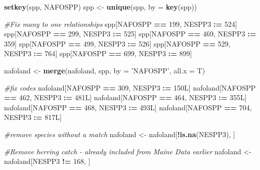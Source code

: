 \documentclass[]{article}
\newenvironment{Shaded}{\begin{snugshade}}{\end{snugshade}}
\newcommand{\KeywordTok}[1]{\textcolor[rgb]{0.13,0.29,0.53}{\textbf{#1}}}
\newcommand{\DataTypeTok}[1]{\textcolor[rgb]{0.13,0.29,0.53}{#1}}
\newcommand{\DecValTok}[1]{\textcolor[rgb]{0.00,0.00,0.81}{#1}}
\newcommand{\StringTok}[1]{\textcolor[rgb]{0.31,0.60,0.02}{#1}}
\newcommand{\CommentTok}[1]{\textcolor[rgb]{0.56,0.35,0.01}{\textit{#1}}}
\newcommand{\OperatorTok}[1]{\textcolor[rgb]{0.81,0.36,0.00}{\textbf{#1}}}
\newcommand{\ErrorTok}[1]{\textcolor[rgb]{0.64,0.00,0.00}{\textbf{#1}}}
\newcommand{\NormalTok}[1]{#1}
\begin{document}
\begin{Shaded}
\begin{Highlighting}[]
{{{{{{{{{{  \KeywordTok{setkey}\NormalTok{(spp, NAFOSPP)}
\NormalTok{  spp <-}\StringTok{ }\KeywordTok{unique}\NormalTok{(spp, }\DataTypeTok{by =} \KeywordTok{key}\NormalTok{(spp))}
  
  \CommentTok{#Fix many to one relationships}
\NormalTok{  spp[NAFOSPP }\OperatorTok{==}\StringTok{ }\DecValTok{199}\NormalTok{, NESPP3 }\OperatorTok{:}\ErrorTok{=}\StringTok{ }\DecValTok{524}\NormalTok{]}
\NormalTok{  spp[NAFOSPP }\OperatorTok{==}\StringTok{ }\DecValTok{299}\NormalTok{, NESPP3 }\OperatorTok{:}\ErrorTok{=}\StringTok{ }\DecValTok{525}\NormalTok{]}
\NormalTok{  spp[NAFOSPP }\OperatorTok{==}\StringTok{ }\DecValTok{469}\NormalTok{, NESPP3 }\OperatorTok{:}\ErrorTok{=}\StringTok{ }\DecValTok{359}\NormalTok{]}
\NormalTok{  spp[NAFOSPP }\OperatorTok{==}\StringTok{ }\DecValTok{499}\NormalTok{, NESPP3 }\OperatorTok{:}\ErrorTok{=}\StringTok{ }\DecValTok{526}\NormalTok{]}
\NormalTok{  spp[NAFOSPP }\OperatorTok{==}\StringTok{ }\DecValTok{529}\NormalTok{, NESPP3 }\OperatorTok{:}\ErrorTok{=}\StringTok{ }\DecValTok{764}\NormalTok{]}
\NormalTok{  spp[NAFOSPP }\OperatorTok{==}\StringTok{ }\DecValTok{699}\NormalTok{, NESPP3 }\OperatorTok{:}\ErrorTok{=}\StringTok{ }\DecValTok{899}\NormalTok{]}
  
\NormalTok{  nafoland <-}\StringTok{ }\KeywordTok{merge}\NormalTok{(nafoland, spp, }\DataTypeTok{by =} \StringTok{'NAFOSPP'}\NormalTok{, }\DataTypeTok{all.x =}\NormalTok{ T)}
  
  \CommentTok{#fix codes}
\NormalTok{  nafoland[NAFOSPP }\OperatorTok{==}\StringTok{ }\DecValTok{309}\NormalTok{, NESPP3 }\OperatorTok{:}\ErrorTok{=}\StringTok{ }\NormalTok{150L]}
\NormalTok{  nafoland[NAFOSPP }\OperatorTok{==}\StringTok{ }\DecValTok{462}\NormalTok{, NESPP3 }\OperatorTok{:}\ErrorTok{=}\StringTok{ }\NormalTok{481L]}
\NormalTok{  nafoland[NAFOSPP }\OperatorTok{==}\StringTok{ }\DecValTok{464}\NormalTok{, NESPP3 }\OperatorTok{:}\ErrorTok{=}\StringTok{ }\NormalTok{355L]}
\NormalTok{  nafoland[NAFOSPP }\OperatorTok{==}\StringTok{ }\DecValTok{468}\NormalTok{, NESPP3 }\OperatorTok{:}\ErrorTok{=}\StringTok{ }\NormalTok{493L]}
\NormalTok{  nafoland[NAFOSPP }\OperatorTok{==}\StringTok{ }\DecValTok{704}\NormalTok{, NESPP3 }\OperatorTok{:}\ErrorTok{=}\StringTok{ }\NormalTok{817L]}
  
  \CommentTok{#remove species without a match}
\NormalTok{  nafoland <-}\StringTok{ }\NormalTok{nafoland[}\OperatorTok{!}\KeywordTok{is.na}\NormalTok{(NESPP3), ]}
  
  \CommentTok{#Remove herring catch - already included from Maine Data earlier}
\NormalTok{  nafoland <-}\StringTok{ }\NormalTok{nafoland[NESPP3 }\OperatorTok{!=}\StringTok{ }\DecValTok{168}\NormalTok{, ]}
  
}}}}}}}}}}
\end{Highlighting}
\end{Shaded}
\end{document}
